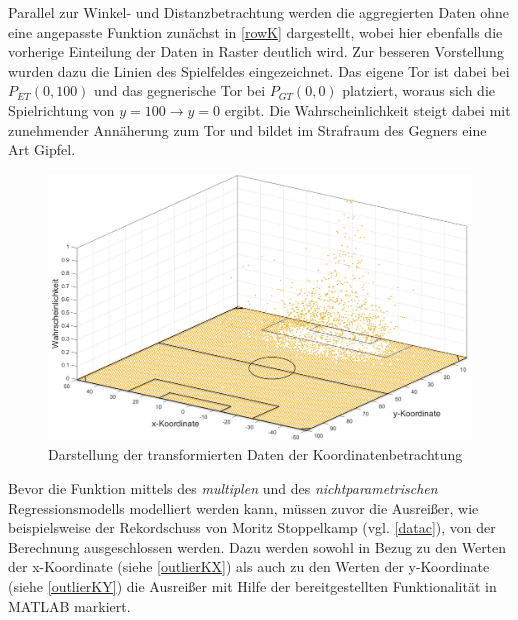 \enlargethispage{2\baselineskip} Parallel zur Winkel- und Distanzbetrachtung werden die aggregierten Daten ohne eine angepasste Funktion zunächst in \vref{rowK} dargestellt, wobei hier ebenfalls die vorherige Einteilung der Daten in Raster deutlich wird. Zur besseren Vorstellung wurden dazu die Linien des Spielfeldes eingezeichnet. Das eigene Tor ist dabei bei $P_{ET}(0,100)$ und das gegnerische Tor bei $P_{GT}(0,0)$ platziert, woraus sich die Spielrichtung von $y=100 \rightarrow y=0$ ergibt. Die Wahrscheinlichkeit steigt dabei mit zunehmender Annäherung zum Tor und bildet im Strafraum des Gegners eine Art \glqq Gipfel\grqq.

\begin{figure}[H]
\centering
\includegraphics[scale=0.345]{se-wa-jpg/rowK}
\caption{Darstellung der transformierten Daten der Koordinatenbetrachtung}
\label{rowK}
\end{figure}

Bevor die Funktion mittels des \textit{multiplen} und des \textit{nichtparametrischen} Regressionsmodells modelliert werden kann, müssen zuvor die Ausreißer, wie beispielsweise der Rekordschuss von Moritz Stoppelkamp (vgl. \vref{datac}), von der Berechnung ausgeschlossen werden. Dazu werden sowohl in Bezug zu den Werten der x-Koordinate (siehe \vref{outlierKX}) als auch zu den Werten der y-Koordinate (siehe \vref{outlierKY}) die Ausreißer mit Hilfe der bereitgestellten Funktionalität in MATLAB markiert.


